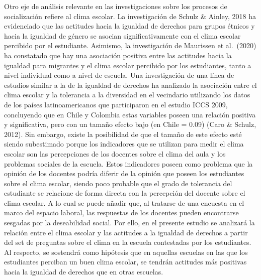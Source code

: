 \documentclass[12pt,twoside]{templates/facsothesis}
\begin{document}
Otro eje de análisis relevante en las investigaciones sobre los procesos de socialización refiere al clima escolar. La investigación de Schulz \& Ainley, 2018 ha evidenciado que las actitudes hacia la igualdad de derechos para grupos étnicos y hacia la igualdad de género se asocian significativamente con el clima escolar percibido por el estudiante. Asimismo, la investigación de Maurissen et al.~(2020) ha constatado que hay una asociación positiva entre las actitudes hacia la igualdad para migrantes y el clima escolar percibido por los estudiantes, tanto a nivel individual como a nivel de escuela. Una investigación de una línea de estudios similar a la de la igualdad de derechos ha analizado la asociación entre el clima escolar y la tolerancia a la diversidad en el vecindario utilizando los datos de los países latinoamericanos que participaron en el estudio ICCS 2009, concluyendo que en Chile y Colombia estas variables poseen una relación positiva y significativa, pero con un tamaño efecto bajo (en Chile = 0.09) (Caro \& Schulz, 2012). Sin embargo, existe la posibilidad de que el tamaño de este efecto esté siendo subestimado porque los indicadores que se utilizan para medir el clima escolar son las percepciones de los docentes sobre el clima del aula y los problemas sociales de la escuela. Estos indicadores poseen como problema que la opinión de los docentes podría diferir de la opinión que poseen los estudiantes sobre el clima escolar, siendo poco probable que el grado de tolerancia del estudiante se relacione de forma directa con la percepción del docente sobre el clima escolar. A lo cual se puede añadir que, al tratarse de una encuesta en el marco del espacio laboral, las respuestas de los docentes pueden encontrarse sesgadas por la deseabilidad social. Por ello, en el presente estudio se analizará la relación entre el clima escolar y las actitudes a la igualdad de derechos a partir del set de preguntas sobre el clima en la escuela contestadas por los estudiantes. Al respecto, se sostendrá como hipótesis que en aquellas escuelas en las que los estudiantes perciban un buen clima escolar, se tendrán actitudes más positivas hacia la igualdad de derechos que en otras escuelas.
\end{document}
